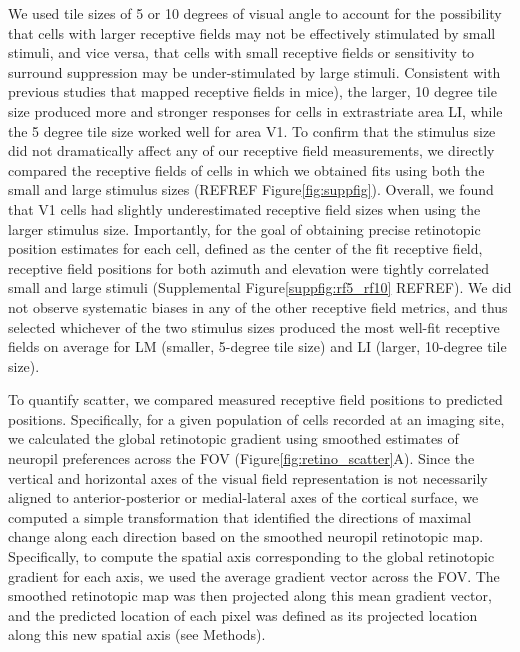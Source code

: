 We used tile sizes of 5 or 10 degrees of visual angle to account for the possibility that cells with larger receptive fields may not be effectively stimulated by small stimuli, and vice versa, that cells with small receptive fields or sensitivity to surround suppression may be under-stimulated by large stimuli. Consistent with previous studies that mapped receptive fields in mice\cite{DeVries2019}), the larger, 10 degree tile size produced more and stronger responses for cells in extrastriate area LI, while the 5 degree tile size worked well for area V1. To confirm that the stimulus size did not dramatically affect any of our receptive field measurements, we directly compared the receptive fields of cells in which we obtained fits using both the small and large stimulus sizes (REFREF Figure\ref{fig:suppfig}). Overall, we found that V1 cells had slightly underestimated receptive field sizes when using the larger stimulus size. Importantly, for the goal of obtaining precise retinotopic position estimates for each cell, defined as the center of the fit receptive field, receptive field positions for both azimuth and elevation were tightly correlated small and large stimuli (Supplemental Figure\ref{suppfig:rf5_rf10} REFREF). We did not observe systematic biases in any of the other receptive field metrics, and thus selected whichever of the two stimulus sizes produced the most well-fit receptive fields on average for LM (smaller, 5-degree tile size) and LI (larger, 10-degree tile size). 

To quantify scatter, we compared measured receptive field positions to predicted positions. Specifically, for a given population of cells recorded at an imaging site, we calculated the global retinotopic gradient using smoothed estimates of neuropil preferences across the FOV (Figure\ref{fig:retino_scatter}A). Since the vertical and horizontal axes of the visual field representation is not necessarily aligned to anterior-posterior or medial-lateral axes of the cortical surface, we computed a simple transformation that identified the directions of maximal change along each direction based on the smoothed neuropil retinotopic map. Specifically, to compute the spatial axis corresponding to the global retinotopic gradient for each axis, we used the average gradient vector across the FOV. The smoothed retinotopic map was then 
projected along this mean gradient vector, and the predicted location of each pixel was defined as its projected location along this new spatial axis (see Methods).  

